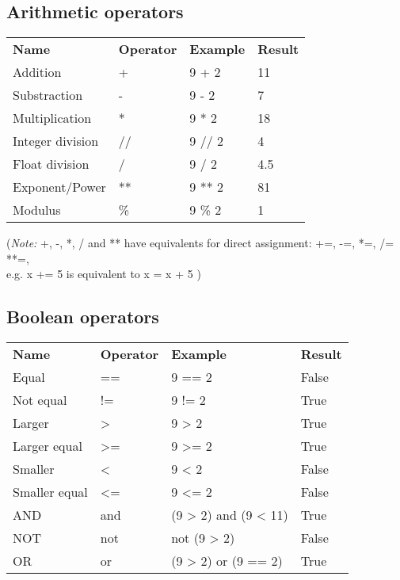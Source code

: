 \documentclass[12pt]{article}
\begin{document}
\subsection*{Arithmetic operators}
\begin{longtable}[c]{ l l l l }
\textbf{Name} & \textbf{Operator} & \textbf{Example} & \textbf{Result}\\[0.2cm]
\textsf{Addition} & + & 9 + 2 & 11 \\
\textsf{Substraction} & -  & 9 - 2 & 7 \\
\textsf{Multiplication} & * & 9 * 2 & 18 \\
\textsf{Integer division} & // & 9 // 2 & 4 \\
\textsf{Float division} & / & 9 / 2 & 4.5 \\
\textsf{Exponent/Power} & ** & 9 ** 2 & 81 \\
\textsf{Modulus} & \% & 9 \% 2 & 1 \\
\end{longtable}

\vspace{0.5cm}
\small{\noindent(\emph{\*Note:} +, -, *, / and ** have equivalents for direct assignment: +=, -=, *=, /= **=, \\
 e.g. x += 5 is equivalent to x = x + 5 )}

\subsection*{Boolean operators}
\begin{longtable}[c]{ l l l l }
\textbf{Name} & \textbf{Operator} & \textbf{Example} & \textbf{Result}\\[0.2cm]
\textsf{Equal} & == & 9 == 2 & False \\
\textsf{Not equal} & != & 9 != 2 & True \\
\textsf{Larger} & >  & 9 > 2 & True \\
\textsf{Larger equal} & >=  & 9 >= 2 & True \\
\textsf{Smaller} & < & 9 < 2 & False \\
\textsf{Smaller equal} & <= & 9 <= 2 & False \\
\textsf{AND} & and & (9 > 2) and (9 < 11) & True \\
\textsf{NOT} & not & not (9 > 2) & False \\
\textsf{OR} & or & (9 > 2) or (9 == 2) & True \\
\end{longtable}
\end{document}
